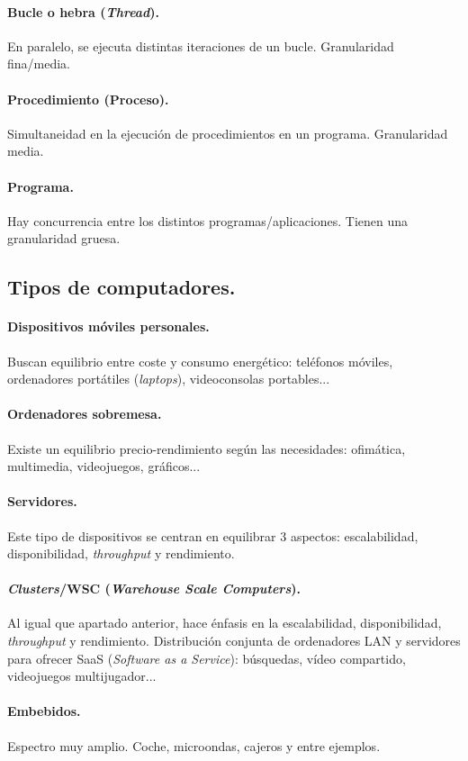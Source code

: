 \documentclass{article}
\begin{document}
\begin{multicols}{2}
		\paragraph{Bucle o hebra (\textit{Thread}).} 
		En paralelo, se ejecuta distintas iteraciones de un bucle. Granularidad fina/media.
		\paragraph{Procedimiento (Proceso).} 
		Simultaneidad en la ejecución de procedimientos en un programa. Granularidad media.
		\paragraph{Programa.} 
		Hay concurrencia entre los distintos programas/aplicaciones. Tienen una granularidad gruesa.
		
		\subsection{Tipos de computadores.}
		\paragraph{Dispositivos móviles personales.}
		Buscan equilibrio entre coste y consumo energético: teléfonos móviles, ordenadores portátiles (\textit{laptops}), videoconsolas portables...
		\paragraph{Ordenadores sobremesa.} 
		Existe un equilibrio precio-rendimiento según las necesidades: ofimática, multimedia, videojuegos,  gráficos...
		\paragraph{Servidores.} 
		Este tipo de dispositivos se centran en equilibrar 3 aspectos: escalabilidad, disponibilidad, \textit{throughput} y rendimiento.
		\paragraph{\textit{Clusters}/WSC (\textit{Warehouse Scale Computers}).} 
		Al igual que apartado anterior, hace énfasis en la escalabilidad, disponibilidad, \textit{throughput} y rendimiento. Distribución conjunta de ordenadores LAN y servidores para ofrecer SaaS (\textit{Software as a Service}): búsquedas, vídeo compartido, videojuegos multijugador...
		\paragraph{Embebidos.} 
		Espectro muy amplio. Coche, microondas, cajeros y entre ejemplos.
		

\end{multicols}
\end{document}

